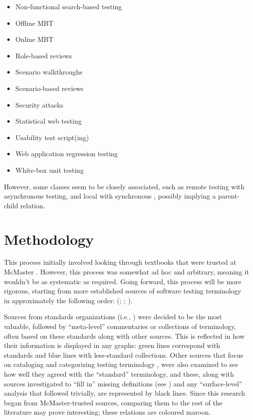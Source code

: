 \begin{itemize}
            \citealp[p.~356]{SakamotoEtAl2013})
      \item Non-functional search-based testing \citep[Tab.~1]{DoğanEtAl2014}
      \item Offline MBT \citepISTQB{}
      \item Online MBT \citepISTQB{}
      \item Role-based reviews \citepISTQB{}
      \item Scenario walkthroughs \citep[Fig.~4]{Gerrard2000a}
      \item Scenario-based reviews \citepISTQB{}
      \item Security attacks \citepISTQB{}
      \item Statistical web testing \citep[p.~185]{DoğanEtAl2014}
      \item Usability test script(ing) \citepISTQB{}
      \item Web application regression testing \cite[Tab.~21]{DoğanEtAl2014}
      \item White-box unit testing \citep[pp.~345-346]{SakamotoEtAl2013}
\end{itemize}

However, some classes seem to be closely associated, such as remote testing
with asynchronous testing, and local with synchronous \citep{JardEtAl1999},
possibly implying a parent-child relation.

\section{Methodology}
\label{method}

This process initially involved looking through textbooks that were trusted at
McMaster \citep{Patton2006, PetersAndPedrycz2000, vanVliet2000}. However, this
process was somewhat ad hoc and arbitrary, meaning it wouldn't be as systematic
as required. Going forward, this process will be more rigorous, starting from
more established sources of software testing terminology in approximately the
following order:
(\citealp{IEEE2022, SWEBOK2024, SWEBOK2014, IEEE2017, IEEE2013, ISO_IEC2023b,
      IEEE2012, ISO_IEC2023a}; \citealpISTQB{}; \citealp{Firesmith2015, IEEE2021}).

Sources from standards organizations (i.e., \citeauthor{IEEE2022}) were decided
to be the most valuable, followed by ``meta-level'' commentaries or collections
of terminology, often based on these standards along with other sources. This
is reflected in how their information is displayed in any graphs: green lines
correspond with standards and blue lines with less-standard collections.
Other sources that focus on cataloging and categorizing testing terminology
\citep[e.g.,][]{KuļešovsEtAl2013}, were also examined to see how well they
agreed with the ``standard'' terminology, and these, along with sources
investigated to ``fill in'' missing definitions (see )
and any ``surface-level'' analysis that followed trivially, are represented by
black lines. Since this research began from McMaster-trusted sources, comparing
them to the rest of the literature may prove interesting; these relations are
coloured maroon.


